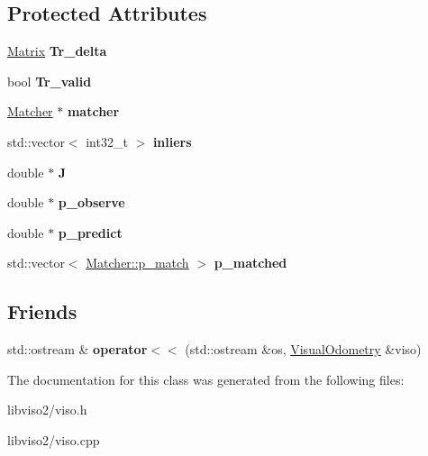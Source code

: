 \subsection*{Protected Attributes}
\begin{DoxyCompactItemize}
\item 
\hypertarget{class_visual_odometry_ae4d1f67aa13d39d4e2d79b66c24d40cd}{\hyperlink{class_matrix}{Matrix} {\bfseries Tr\+\_\+delta}}\label{class_visual_odometry_ae4d1f67aa13d39d4e2d79b66c24d40cd}

\item 
\hypertarget{class_visual_odometry_a7adb170f1f42afc4af02967fa59d5bd4}{bool {\bfseries Tr\+\_\+valid}}\label{class_visual_odometry_a7adb170f1f42afc4af02967fa59d5bd4}

\item 
\hypertarget{class_visual_odometry_acad7f354f64ac9c31ffdca21ad4a81ea}{\hyperlink{class_matcher}{Matcher} $\ast$ {\bfseries matcher}}\label{class_visual_odometry_acad7f354f64ac9c31ffdca21ad4a81ea}

\item 
\hypertarget{class_visual_odometry_a90a6b44dea99f73af1becbec27f574dc}{std\+::vector$<$ int32\+\_\+t $>$ {\bfseries inliers}}\label{class_visual_odometry_a90a6b44dea99f73af1becbec27f574dc}

\item 
\hypertarget{class_visual_odometry_a460b88e3c6413862891cdac83c5f013d}{double $\ast$ {\bfseries J}}\label{class_visual_odometry_a460b88e3c6413862891cdac83c5f013d}

\item 
\hypertarget{class_visual_odometry_a48bbbc977f2de8bb647842a9a14fed34}{double $\ast$ {\bfseries p\+\_\+observe}}\label{class_visual_odometry_a48bbbc977f2de8bb647842a9a14fed34}

\item 
\hypertarget{class_visual_odometry_a58bee4df50653cd9b7de41f7c0b53280}{double $\ast$ {\bfseries p\+\_\+predict}}\label{class_visual_odometry_a58bee4df50653cd9b7de41f7c0b53280}

\item 
\hypertarget{class_visual_odometry_a80f624e6d5e587d972c3e69781321ed0}{std\+::vector$<$ \hyperlink{struct_matcher_1_1p__match}{Matcher\+::p\+\_\+match} $>$ {\bfseries p\+\_\+matched}}\label{class_visual_odometry_a80f624e6d5e587d972c3e69781321ed0}

\end{DoxyCompactItemize}
\subsection*{Friends}
\begin{DoxyCompactItemize}
\item 
\hypertarget{class_visual_odometry_a46e1f3711d18286d269160ee44217306}{std\+::ostream \& {\bfseries operator$<$$<$} (std\+::ostream \&os, \hyperlink{class_visual_odometry}{Visual\+Odometry} \&viso)}\label{class_visual_odometry_a46e1f3711d18286d269160ee44217306}

\end{DoxyCompactItemize}


The documentation for this class was generated from the following files\+:\begin{DoxyCompactItemize}
\item 
libviso2/viso.\+h\item 
libviso2/viso.\+cpp\end{DoxyCompactItemize}
